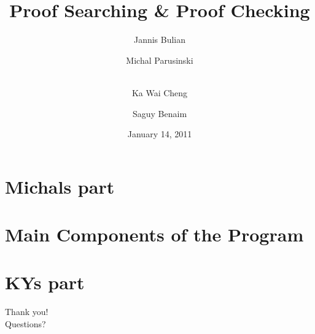 \documentclass[usenames,dvipsnames]{beamer}
\title{Proof Searching \& Proof Checking}
\author[Jannis Bulian \and\\ Michal Parusinski \and\\ Ka Wai Cheng \and\\ Saguy Benaim]{Jannis Bulian \and Michal Parusinski \and \\ Ka Wai Cheng \and Saguy Benaim}
\date{January 14, 2011}
\institute{Imperial College London\\
           Department of Computing}
\begin{document}
\maketitle
\tableofcontents

\section{Michals part}

\section[Main Components]{Main Components of the Program}

\section{KYs part}



\appendix

\begin{frame}
  \begin{center}
    {\Huge Thank you! \\}
    \vspace{1cm}
    {\Huge Questions?}
  \end{center}
\end{frame}

\begin{frame}
  
  
\end{frame}
\end{document}
